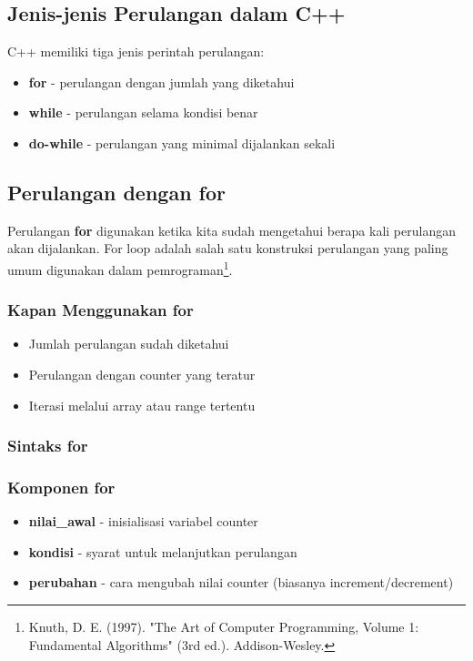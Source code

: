 \subsection{Jenis-jenis Perulangan dalam C++}

C++ memiliki tiga jenis perintah perulangan:
\begin{itemize}
\item \textbf{for} - perulangan dengan jumlah yang diketahui
\item \textbf{while} - perulangan selama kondisi benar
\item \textbf{do-while} - perulangan yang minimal dijalankan sekali
\end{itemize}

\subsection{Perulangan dengan for}\label{perulangan-dengan-for}

Perulangan \textbf{for} digunakan ketika kita sudah mengetahui berapa kali perulangan akan dijalankan. For loop adalah salah satu konstruksi perulangan yang paling umum digunakan dalam pemrograman\footnote{Knuth, D. E. (1997). "The Art of Computer Programming, Volume 1: Fundamental Algorithms" (3rd ed.). Addison-Wesley.}.

\subsubsection{Kapan Menggunakan for}

\begin{itemize}
\item Jumlah perulangan sudah diketahui
\item Perulangan dengan counter yang teratur
\item Iterasi melalui array atau range tertentu
\end{itemize}

\subsubsection{Sintaks for}



\subsubsection{Komponen for}

\begin{itemize}
\item \textbf{nilai\_awal} - inisialisasi variabel counter
\item \textbf{kondisi} - syarat untuk melanjutkan perulangan
\item \textbf{perubahan} - cara mengubah nilai counter (biasanya increment/decrement)
\end{itemize}

